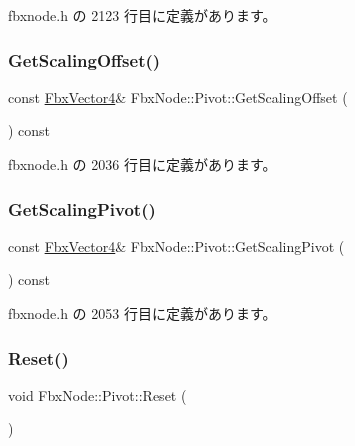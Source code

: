  fbxnode.\+h の 2123 行目に定義があります。

\mbox{\label{class_fbx_node_1_1_pivot_a9822cb96fdceb2b02e6ac9ba721ceb5c}} 
\subsubsection{\texorpdfstring{Get\+Scaling\+Offset()}{GetScalingOffset()}}
{\footnotesize\ttfamily const \hyperlink{class_fbx_vector4}{Fbx\+Vector4}\& Fbx\+Node\+::\+Pivot\+::\+Get\+Scaling\+Offset (\begin{DoxyParamCaption}{ }\end{DoxyParamCaption}) const\hspace{0.3cm}{\ttfamily [inline]}}



 fbxnode.\+h の 2036 行目に定義があります。

\mbox{\label{class_fbx_node_1_1_pivot_a82eed97aae88d20e5e56732038514941}} 
\subsubsection{\texorpdfstring{Get\+Scaling\+Pivot()}{GetScalingPivot()}}
{\footnotesize\ttfamily const \hyperlink{class_fbx_vector4}{Fbx\+Vector4}\& Fbx\+Node\+::\+Pivot\+::\+Get\+Scaling\+Pivot (\begin{DoxyParamCaption}{ }\end{DoxyParamCaption}) const\hspace{0.3cm}{\ttfamily [inline]}}



 fbxnode.\+h の 2053 行目に定義があります。

\mbox{\label{class_fbx_node_1_1_pivot_a7282010ee140c753e6f8fdaf014d9c8d}} 
\subsubsection{\texorpdfstring{Reset()}{Reset()}}
{\footnotesize\ttfamily void Fbx\+Node\+::\+Pivot\+::\+Reset (\begin{DoxyParamCaption}{ }\end{DoxyParamCaption})\hspace{0.3cm}{\ttfamily [inline]}}



